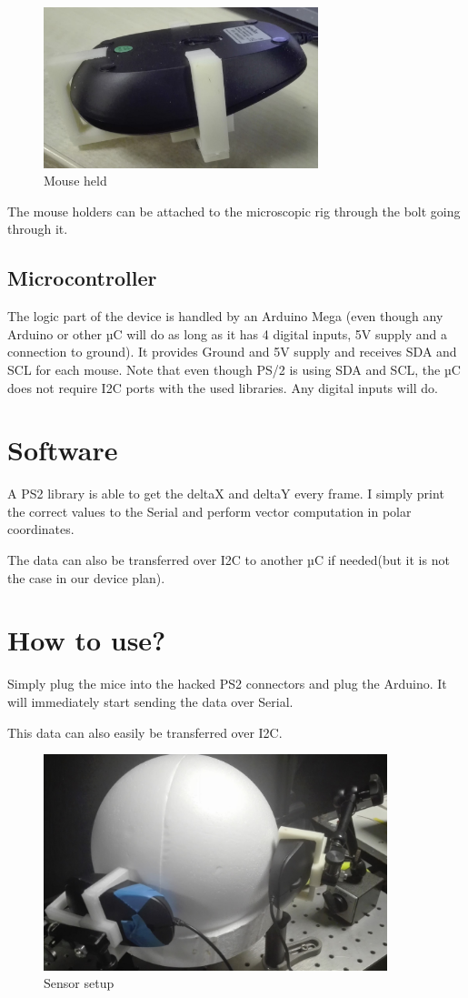 \documentclass[a4paper]{article}
\begin{document}
\begin{figure}[h!]
    \centering
    \includegraphics[width = 8cm]{images/cad3.jpg}
    \caption{Mouse held}
    \label{fig:cad3}
\end{figure}

The mouse holders can be attached to the microscopic rig through the bolt going through it.

\subsection{Microcontroller}
The logic part of the device is handled by an Arduino Mega (even though any Arduino or other µC will do as long as it has 4 digital inputs, 5V supply and a connection to ground). It provides Ground and 5V supply and receives SDA and SCL for each mouse.
Note that even though PS/2 is using SDA and SCL, the µC does not require I2C ports with the used libraries. Any digital inputs will do.

\section{Software}
A PS2 library is able to get the deltaX and deltaY every frame. I simply print the correct values to the Serial and perform vector computation in polar coordinates.

The data can also be transferred over I2C to another µC if needed(but it is not the case in our device plan).

\section{How to use?}
Simply plug the mice into the hacked PS2 connectors and plug the Arduino. It will immediately start sending the data over Serial.

This data can also easily be transferred over I2C.

\begin{figure}[h!b!t!]
    \centering
    \includegraphics[width = 10cm]{images/setup.jpg}
    \caption{Sensor setup}
    \label{fig:setup}
\end{figure}
\end{document}

